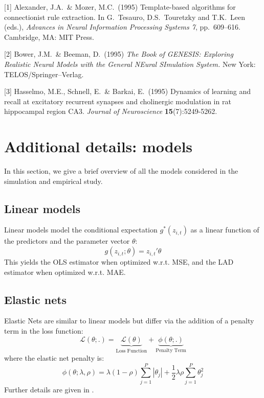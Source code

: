 \documentclass{article}
\begin{document}
\small

[1] Alexander, J.A.\ \& Mozer, M.C.\ (1995) Template-based algorithms for
connectionist rule extraction. In G.\ Tesauro, D.S.\ Touretzky and T.K.\ Leen
(eds.), {\it Advances in Neural Information Processing Systems 7},
pp.\ 609--616. Cambridge, MA: MIT Press.

[2] Bower, J.M.\ \& Beeman, D.\ (1995) {\it The Book of GENESIS: Exploring
  Realistic Neural Models with the General NEural SImulation System.}  New York:
TELOS/Springer--Verlag.

[3] Hasselmo, M.E., Schnell, E.\ \& Barkai, E.\ (1995) Dynamics of learning and
recall at excitatory recurrent synapses and cholinergic modulation in rat
hippocampal region CA3. {\it Journal of Neuroscience} {\bf 15}(7):5249-5262.


\appendix

\newpage

\section{Additional details: models}
In this section, we give a brief overview of all the models considered in the simulation and empirical study.

\subsection{Linear models}
Linear models model the conditional expectation \( g^*(z_{i, t}) \) as a linear function of the predictors and the parameter vector \( \theta \):
\begin{equation}
g(z_{i, t};\theta) = z_{i, t}' \theta
\end{equation}
This yields the OLS estimator when optimized w.r.t. MSE, and the LAD estimator when optimized w.r.t. MAE.

\subsection{Elastic nets}
Elastic Nets are similar to linear models but differ via the addition of a penalty term in the loss function:
\begin{equation}
\mathcal{L(\theta;.)} = 
\underset{\text{Loss Function}}{\underbrace{\mathcal{L(\theta)}}} + 
\underset{\text{Penalty Term}}{\underbrace{\phi(\theta;.)}}
\end{equation}
where the elastic net penalty \cite{zou_regularization_2005} is:
\begin{equation}
\phi(\theta;\lambda,\rho) = 
\lambda(1-\rho) \sum_{j = 1}^{P}|\theta_j| +
\frac{1}{2} \lambda \rho \sum_{j = 1}^{P}\theta_j^2
\end{equation}
Further details are given in \cite{zou_regularization_2005}.
\end{document}
